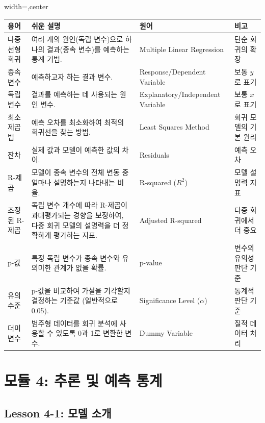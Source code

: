 \documentclass[11pt,a4paper]{book}
\theoremstyle{definition}
\begin{document}
\begin{definitionbox}
\begin{adjustbox}{width=\textwidth,center}
\begin{tabular}{p{} p{} p{} p{}}
\toprule
\textbf{용어} & \textbf{쉬운 설명} & \textbf{원어} & \textbf{비고} \\
\midrule
다중 선형 회귀 & 여러 개의 원인(독립 변수)으로 하나의 결과(종속 변수)를 예측하는 통계 기법. & Multiple Linear Regression & 단순 회귀의 확장 \\
종속 변수 & 예측하고자 하는 결과 변수. & Response/Dependent Variable & 보통 $y$로 표기 \\
독립 변수 & 결과를 예측하는 데 사용되는 원인 변수. & Explanatory/Independent Variable & 보통 $x$로 표기 \\
최소 제곱법 & 예측 오차를 최소화하여 최적의 회귀선을 찾는 방법. & Least Squares Method & 회귀 모델의 기본 원리 \\
잔차 & 실제 값과 모델이 예측한 값의 차이. & Residuals & 예측 오차 \\
R-제곱 & 모델이 종속 변수의 전체 변동 중 얼마나 설명하는지 나타내는 비율. & R-squared ($R^2$) & 모델 설명력 지표 \\
조정된 R-제곱 & 독립 변수 개수에 따라 R-제곱이 과대평가되는 경향을 보정하여, 다중 회귀 모델의 설명력을 더 정확하게 평가하는 지표. & Adjusted R-squared & 다중 회귀에서 더 중요 \\
p-값 & 특정 독립 변수가 종속 변수와 유의미한 관계가 없을 확률. & p-value & 변수의 유의성 판단 기준 \\
유의 수준 & p-값을 비교하여 가설을 기각할지 결정하는 기준값 (일반적으로 0.05). & Significance Level ($\alpha$) & 통계적 판단 기준 \\
더미 변수 & 범주형 데이터를 회귀 분석에 사용할 수 있도록 0과 1로 변환한 변수. & Dummy Variable & 질적 데이터 처리 \\
\bottomrule
\end{tabular}
\end{adjustbox}
\end{definitionbox}


\section{모듈 4: 추론 및 예측 통계}

\subsection{Lesson 4-1: 모델 소개}
\end{document}
